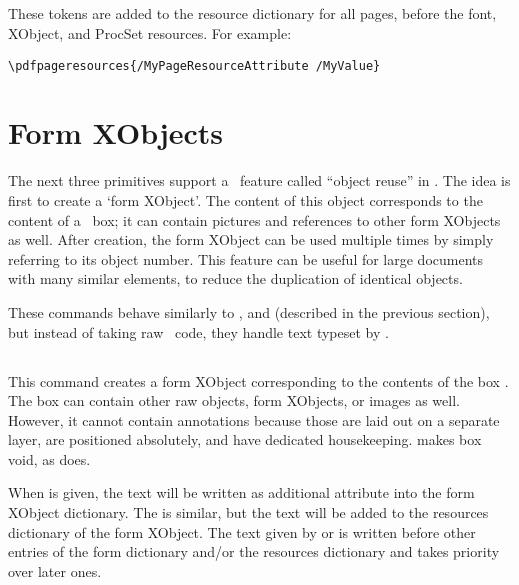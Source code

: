\documentclass{pdftexmanual}
\begin{document}
\subsection{}

These tokens are added to the resource dictionary for all pages, before
the font, XObject, and ProcSet resources. For example:

\begin{verbatim}
\pdfpageresources{/MyPageResourceAttribute /MyValue}
\end{verbatim}

\section{Form XObjects}

The next three primitives support a \PDF\ feature called ``object
reuse'' in \PDFTEX. The idea is first to create a `form XObject'. The
content of this object corresponds to the content of a \TEX\ box; it can
contain pictures and references to other form XObjects as well. After
creation, the form XObject can be used multiple times by simply
referring to its object number. This feature can be useful for large
documents with many similar elements, to reduce the duplication of
identical objects.

These commands behave similarly to ,  and
 (described in the previous section), but instead of
taking raw \PDF\ code, they handle text typeset by \TEX.

\subsection{}

This command creates a form XObject corresponding to the contents of the
box . The box can contain other raw objects, form
XObjects, or images as well. However, it cannot contain annotations
because those are laid out on a separate layer, are positioned
absolutely, and have dedicated housekeeping.  makes box
 void, as  does.

When  is given, the text will be written
as additional attribute into the form XObject dictionary. The
 is similar, but the text will be added
to the resources dictionary of the form XObject. The text given by
 or  is written before
other entries of the form dictionary and\slash or the resources dictionary
and takes priority over later ones.
\end{document}
